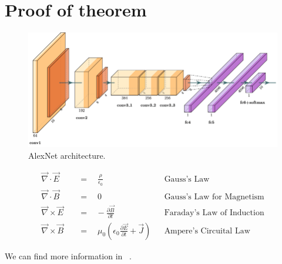 \chapter{Proof of theorem}\label{app:Proof of theorem}
\lipsum[1]
\begin{figure}[thbp]
    \centering
    \includegraphics[width=\textwidth]{img/appendixA/alexnet.png}
    \caption{AlexNet architecture.}\label{fig:alexnet}
\end{figure}
\lipsum[1]
\begin{align}
     \vec{\nabla} \cdot \vec{E} \quad &=\quad\frac{\rho}{\epsilon_0} &&\text{Gauss's Law} \\      
    \vec{\nabla} \cdot \vec{B} \quad &=\quad 0 &&\text{Gauss's Law for Magnetism}\\
    \vec{\nabla} \times \vec{E} \quad &=\hspace{10pt}-\frac{\partial{\vec{B}}}{\partial{t}} &&\text{Faraday's Law of Induction} \\ 
    \vec{\nabla} \times \vec{B} \quad &=\quad \mu_0\left( \epsilon_0\frac{\partial{\vec{E}}}{\partial{t}}+\vec{J}\right) &&\text{Ampere's Circuital Law}
\end{align}

We can find more information in ~\cite{li2018deep}.